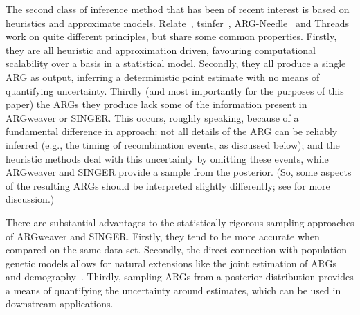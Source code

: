 \documentclass{article}
\begin{document}
The second class of inference method that has been of recent interest 
is based on heuristics and approximate models.
Relate~\citep{speidel_method_2019},
tsinfer~\citep{kelleher_inferring_2019},
ARG-Needle~\citep{zhang_biobank-scale_2023} 
and Threads~\citep{gunnarsson_scalable_2024}
work on quite different 
principles, but share some common properties. 
Firstly, they are all 
heuristic and approximation driven, favouring computational
scalability over a basis in a statistical model.
Secondly, they all produce a single
ARG as output, inferring a deterministic point estimate with no means 
of quantifying uncertainty. Thirdly (and most importantly for the 
purposes of this paper) the ARGs they produce 
lack some of the information present in ARGweaver or SINGER. 
This occurs, roughly speaking, because of a fundamental difference in approach:
not all details of the ARG can be reliably inferred
(e.g., the timing of recombination events, as discussed below);
and the heuristic methods deal with this uncertainty by omitting these events,
while ARGweaver and SINGER provide a sample from the posterior.
(So, some aspects of the resulting ARGs should be interpreted slightly differently;
see \citet{wong_general_2023} for more discussion.)

There are substantial advantages to the statistically rigorous sampling 
approaches of ARGweaver and SINGER.
Firstly, they tend to be more accurate when compared on the same data set.
Secondly, the direct connection with population genetic models allows for
natural extensions like the joint estimation of ARGs and
demography~\citep{hubisz_mapping_2020}.
Thirdly, sampling ARGs from a
posterior distribution provides a means of quantifying the uncertainty 
around estimates, which can be used in downstream applications.
\end{document}
